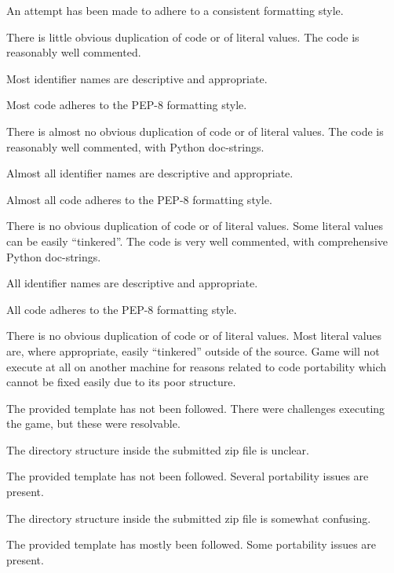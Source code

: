 \documentclass{../../fal_assignment}
\begin{document}
\begin{markingrubric}
            \par An attempt has been made to adhere to a consistent formatting style.
             \par There is little obvious duplication of code or of literal values.           
        \grade The code is reasonably well commented.
            \par Most identifier names are descriptive and appropriate.
            \par Most code adheres to the PEP-8 formatting style.
             \par There is almost no obvious duplication of code or of literal values.   
        \grade The code is reasonably well commented, with Python doc-strings.
            \par Almost all identifier names are descriptive and appropriate.
            \par Almost all code adheres to the PEP-8 formatting style.
             \par There is no obvious duplication of code or of literal values. Some literal values can be easily ``tinkered''. 
        \grade The code is very well commented, with comprehensive Python doc-strings.
            \par All identifier names are descriptive and appropriate.
            \par All code adheres to the PEP-8 formatting style.
             \par There is no obvious duplication of code or of literal values. Most literal values are, where appropriate, easily ``tinkered'' outside of the source.  
%
        \grade\fail Game will not execute at all on another machine for reasons related to code portability which cannot be fixed easily due to its poor structure.
            \par The provided template has not been followed.
        \grade There were challenges executing the game, but these were resolvable.
            \par The directory structure inside the submitted zip file is unclear.
            \par The provided template has not been followed.
        \grade Several portability issues are present.
            \par The directory structure inside the submitted zip file is somewhat confusing.
            \par The provided template has mostly been followed.
        \grade Some portability issues are present.

\end{markingrubric}
\end{document}
